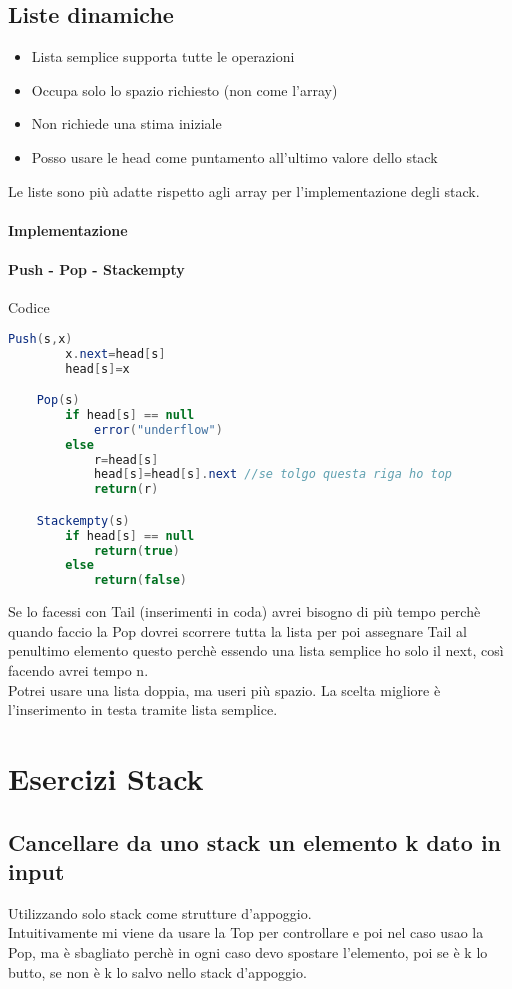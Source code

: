 \subsection{Liste dinamiche}
\begin{itemize}
    \item Lista semplice supporta tutte le operazioni
    \item Occupa solo lo spazio richiesto (non come l'array)
    \item Non richiede una stima iniziale
    \item Posso usare le head come puntamento all'ultimo valore dello stack
\end{itemize}
Le liste sono più adatte rispetto agli array per l'implementazione degli stack.
\paragraph*{Implementazione}
\paragraph*{Push - Pop - Stackempty} Codice
\begin{lstlisting}[language=Java]
    Push(s,x)
        x.next=head[s]
        head[s]=x

    Pop(s)
        if head[s] == null
            error("underflow")
        else
            r=head[s]
            head[s]=head[s].next //se tolgo questa riga ho top
            return(r)

    Stackempty(s)
        if head[s] == null
            return(true)
        else
            return(false)
\end{lstlisting}
Se lo facessi con Tail (inserimenti in coda) avrei bisogno di più tempo perchè
quando faccio la Pop dovrei scorrere tutta la lista per poi assegnare Tail al penultimo elemento
questo perchè essendo una lista semplice ho solo il next, così facendo avrei tempo n.\\
Potrei usare una lista doppia, ma useri più spazio. La scelta migliore è
l'inserimento in testa tramite lista semplice.
\section{Esercizi Stack}
\subsection{Cancellare da uno stack un elemento k dato in input}
Utilizzando solo stack come strutture d'appoggio.\\
Intuitivamente mi viene da usare la Top per controllare e poi nel caso
usao la Pop, ma è sbagliato perchè in ogni caso devo spostare l'elemento,
poi se è k lo butto, se non è k lo salvo nello stack d'appoggio.
